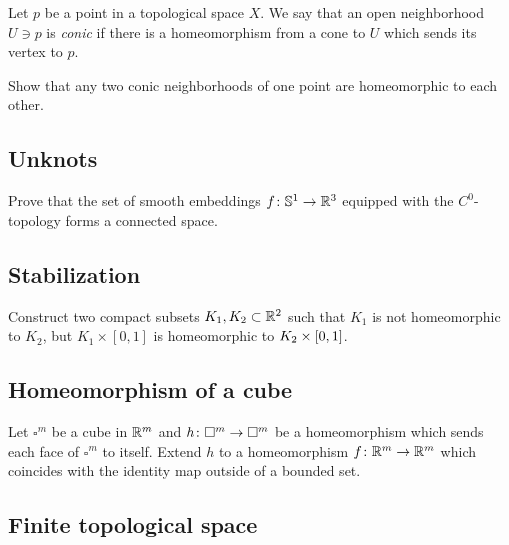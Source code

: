 Let $p$ be a point in a topological space $X$.
We say that an open neighborhood $U\ni p$ is \emph{conic}
if there is a homeomorphism from a cone
to $U$ which sends its vertex to $p$.

\begin{pr}  
Show that any two conic neighborhoods of one point are homeomorphic to each other.
\end{pr}

\subsection*{Unknots\easy}\label{No knots}

\begin{pr}
Prove that the set of smooth embeddings $f\:\mathbb{S}^1\z\to\RR^3$ equipped with the $C^0$-topology 
forms a connected space.
\end{pr}

\subsection*{Stabilization}\label{Simple stabilization}

\begin{pr}
Construct two compact subsets $K_1, K_2\subset\mathbb{R}^2$ such that
$K_1$ is not homeomorphic to $K_2$, but $K_1\times[0,1]$ is homeomorphic to $K_2\z\times[0,1]$.
\end{pr}

\subsection*{Homeomorphism of a cube}\label{Homeomorphism of cube}

\begin{pr}
Let $\square^m$ be a cube in $\mathbb{R}^m$
and $h\:\square^m\z\to\square^m$ be
a homeomorphism which sends each face of $\square^m$ to itself.
Extend $h$ to a homeomorphism $f\colon\mathbb{R}^m\to\mathbb{R}^m$ which coincides with the identity map outside of a bounded set.    
\end{pr}

\subsection*{Finite topological space\easy}\label{Finite topological space}



